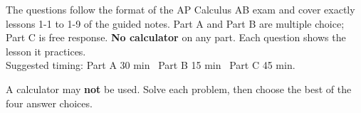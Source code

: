 \documentclass[11pt]{article}
\begin{document}

\begin{keyidea}
The questions follow the format of the AP Calculus AB exam and cover exactly lessons 1-1 to 1-9 of the guided notes. Part A and Part B are multiple choice; Part C is free response. \textbf{No calculator} on any part. Each question shows the lesson it practices.\\
Suggested timing: Part A 30 min \textbullet\ Part B 15 min \textbullet\ Part C 45 min.
\end{keyidea}

\begin{directions}
A calculator may \textbf{not} be used. Solve each problem, then choose the best of the four answer choices.
\end{directions}
\end{document}
